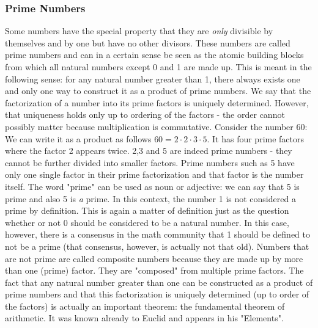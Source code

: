 \subsubsection{Prime Numbers}
Some numbers have the special property that they are \emph{only} divisible by themselves and by one but have no other divisors. These numbers are called prime numbers and can in a certain sense be seen as the atomic building blocks from which all natural numbers except 0 and 1 are made up. This is meant in the following sense: for any natural number greater than 1, there always exists one and only one way to construct it as a product of prime numbers. We say that the factorization of a number into its prime factors is uniquely determined. However, that uniqueness holds only up to ordering of the factors - the order cannot possibly matter because multiplication is commutative. Consider the number 60: We can write it as a product as follows $60 = 2 \cdot 2 \cdot 3 \cdot 5$. It has four prime factors where the factor 2 appears twice. 2,3 and 5 are indeed prime numbers - they cannot be further divided into smaller factors. Prime numbers such as 5 have only one single factor in their prime factorization and that factor is the number itself. The word "prime" can be used as noun or adjective: we can say that 5 is prime and also 5 is \emph{a} prime. In this context, the number 1 is not considered a prime by definition. This is again a matter of definition just as the question whether or not 0 should be considered to be a natural number. In this case, however, there is a consensus in the math community that 1 should be defined to not be a prime (that consensus, however, is actually not that old). Numbers that are not prime are called composite numbers because they are made up by more than one (prime) factor. They are "composed" from multiple prime factors. The fact that any natural number greater than one can be constructed as a product of prime numbers and that this factorization is uniquely determined (up to order of the factors) is actually an important theorem: the fundamental theorem of arithmetic. It was known already to Euclid and appears in his "Elements".

